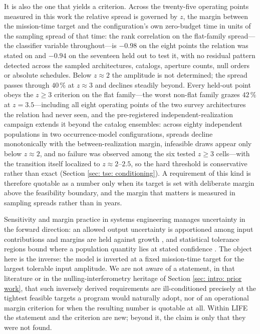 \documentclass[12pt,a4paper]{article}
\numberwithin{equation}{section}
\numberwithin{figure}{section}
\numberwithin{table}{section}
\begin{document}
It is also the one that yields a criterion. Across the twenty-five operating points measured in this work the relative spread is governed by $z$, the margin between the mission-time target and the configuration's own zero-budget time in units of the sampling spread of that time: the rank correlation on the flat-family spread---the classifier variable throughout---is $-0.98$ on the eight points the relation was stated on and $-0.94$ on the seventeen held out to test it, with no residual pattern detected across the sampled architectures, catalogs, aperture counts, null orders or absolute schedules. Below $z\approx2$ the amplitude is not determined; the spread passes through $40\,\%$ at $z\approx3$ and declines steadily beyond. Every held-out point obeys the $z\geq3$ criterion on the flat family---the worst non-flat family grazes $42\,\%$ at $z=3.5$---including all eight operating points of the two survey architectures the relation had never seen, and the pre-registered independent-realization campaign extends it beyond the catalog ensembles: across eighty independent populations in two occurrence-model configurations, spreads decline monotonically with the between-realization margin, infeasible draws appear only below $z\approx2$, and no failure was observed among the six tested $z\geq3$ cells---with the transition itself localized to $z\approx2$--$2.5$, so the hard threshold is conservative rather than exact (Section \ref{sec: tse: conditioning}). A requirement of this kind is therefore quotable as a number only when its target is set with deliberate margin above the feasibility boundary, and the margin that matters is measured in sampling spreads rather than in years.

Sensitivity and margin practice in systems engineering manages uncertainty in the forward direction: an allowed output uncertainty is apportioned among input contributions and margins are held against growth \cite{curran2018sensitivity, nasa2017seh, thunnissen2004margins}, and statistical tolerance regions bound where a population quantity lies at stated confidence \cite{krishnamoorthy2009tolerance}. The object here is the inverse: the model is inverted at a fixed mission-time target for the largest tolerable input amplitude. We are not aware of a statement, in that literature or in the nulling-interferometry heritage of Section \ref{sec: intro: prior work}, that such inversely derived requirements are ill-conditioned precisely at the tightest feasible targets a program would naturally adopt, nor of an operational margin criterion for when the resulting number is quotable at all. Within LIFE the statement and the criterion are new; beyond it, the claim is only that they were not found.
\end{document}
